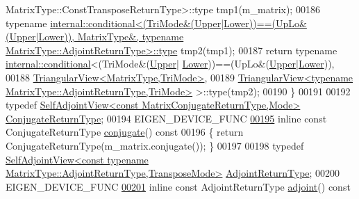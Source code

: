 \begin{DoxyCode}
{       MatrixType::ConstTransposeReturnType>::type}
       tmp1(m\_matrix);
00186       \textcolor{keyword}{typename} 
      \hyperlink{class_eigen_1_1internal_1_1_tensor_lazy_evaluator_writable}{internal::conditional<(TriMode&(Upper|Lower))==(UpLo&(Upper|Lower)), MatrixType&, typename
       MatrixType::AdjointReturnType>::type}
       tmp2(tmp1);
00187       \textcolor{keywordflow}{return} \textcolor{keyword}{typename} \hyperlink{struct_eigen_1_1internal_1_1conditional}{internal::conditional}<(TriMode&(\hyperlink{group__enums_gga39e3366ff5554d731e7dc8bb642f83cda6bcb58be3b8b8ec84859ce0c5ac0aaec}{Upper}|
      \hyperlink{group__enums_gga39e3366ff5554d731e7dc8bb642f83cda891792b8ed394f7607ab16dd716f60e6}{Lower}))==(UpLo&(\hyperlink{group__enums_gga39e3366ff5554d731e7dc8bb642f83cda6bcb58be3b8b8ec84859ce0c5ac0aaec}{Upper}|\hyperlink{group__enums_gga39e3366ff5554d731e7dc8bb642f83cda891792b8ed394f7607ab16dd716f60e6}{Lower})),
00188                                    \hyperlink{group___core___module_class_eigen_1_1_triangular_view}{TriangularView<MatrixType,TriMode>},
00189                                    
      \hyperlink{group___core___module_class_eigen_1_1_triangular_view}{TriangularView<typename MatrixType::AdjointReturnType,TriMode>}
       >::type(tmp2);
00190     \}
00191 
00192     \textcolor{keyword}{typedef} \hyperlink{group___core___module_class_eigen_1_1_self_adjoint_view}{SelfAdjointView<const MatrixConjugateReturnType,Mode>}
       \hyperlink{group___core___module_class_eigen_1_1_self_adjoint_view}{ConjugateReturnType};
00194     EIGEN\_DEVICE\_FUNC
\hyperlink{group___core___module_aee8afbae3643e8af7cdfb5791404fc22}{00195}     \textcolor{keyword}{inline} \textcolor{keyword}{const} ConjugateReturnType \hyperlink{group___core___module_aee8afbae3643e8af7cdfb5791404fc22}{conjugate}()\textcolor{keyword}{ const}
00196 \textcolor{keyword}{    }\{ \textcolor{keywordflow}{return} ConjugateReturnType(m\_matrix.conjugate()); \}
00197 
00198     \textcolor{keyword}{typedef} 
      \hyperlink{group___core___module_class_eigen_1_1_self_adjoint_view}{SelfAdjointView<const typename MatrixType::AdjointReturnType,TransposeMode>}
       \hyperlink{group___core___module_class_eigen_1_1_self_adjoint_view}{AdjointReturnType};
00200     EIGEN\_DEVICE\_FUNC
\hyperlink{group___core___module_a2c19217199aaec1dc208f0e3f437dae6}{00201}     \textcolor{keyword}{inline} \textcolor{keyword}{const} AdjointReturnType \hyperlink{group___core___module_a2c19217199aaec1dc208f0e3f437dae6}{adjoint}()\textcolor{keyword}{ const}

\end{DoxyCode}

